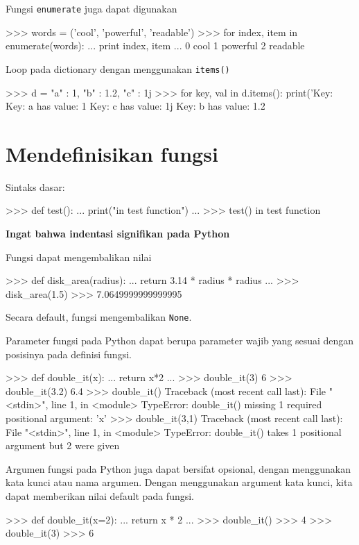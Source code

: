 \documentclass[a4paper,11pt]{extarticle}
\begin{document}
Fungsi \texttt{enumerate} juga dapat digunakan
\begin{pyconcode}
>>> words = ('cool', 'powerful', 'readable')
>>> for index, item in enumerate(words):
...     print index, item
...     
0 cool
1 powerful
2 readable
\end{pyconcode}


Loop pada dictionary dengan menggunakan \texttt{items()}
\begin{pyconcode}
>>> d = {"a" : 1, "b" : 1.2, "c" : 1j}
>>> for key, val in d.items():
        print('Key: %
Key: a has value: 1
Key: c has value: 1j
Key: b has value: 1.2
\end{pyconcode}


\section{Mendefinisikan fungsi}

Sintaks dasar:
\begin{pyconcode}
>>> def test():
...     print("in test function")
...
>>> test()
in test function
\end{pyconcode}

\textbf{Ingat bahwa indentasi signifikan pada Python}

Fungsi dapat mengembalikan nilai
\begin{pyconcode}
>>> def disk_area(radius):
...     return 3.14 * radius * radius
...
>>> disk_area(1.5)
>>> 7.0649999999999995
\end{pyconcode}

Secara default, fungsi mengembalikan \texttt{None}.

Parameter fungsi pada Python dapat berupa parameter wajib yang sesuai
dengan posisinya pada definisi fungsi.

\begin{pyconcode}
>>> def double_it(x):
...     return x*2
... 
>>> double_it(3)
6
>>> double_it(3.2)
6.4
>>> double_it()
Traceback (most recent call last):
  File "<stdin>", line 1, in <module>
TypeError: double_it() missing 1 required positional argument: 'x'
>>> double_it(3,1)
Traceback (most recent call last):
  File "<stdin>", line 1, in <module>
TypeError: double_it() takes 1 positional argument but 2 were given
\end{pyconcode}

Argumen fungsi pada Python juga dapat bersifat
opsional, dengan menggunakan kata kunci atau nama argumen.
Dengan menggunakan argument kata kunci, kita dapat memberikan nilai
default pada fungsi.
\begin{pyconcode}
>>> def double_it(x=2):
...     return x * 2
...
>>> double_it()
>>> 4
>>> double_it(3)
>>> 6
\end{pyconcode}
\end{document}
